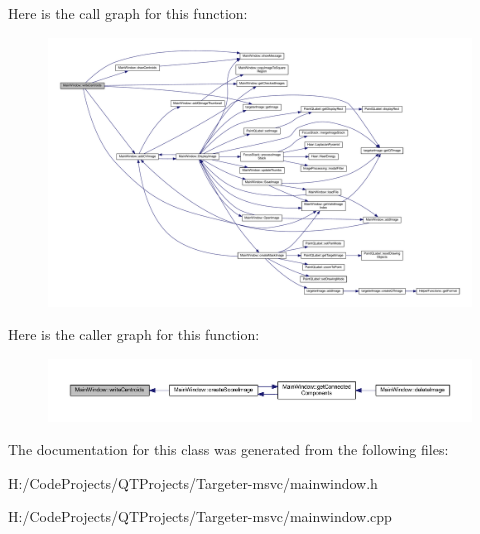 Here is the call graph for this function\+:
\nopagebreak
\begin{figure}[H]
\begin{center}
\leavevmode
\includegraphics[width=350pt]{class_main_window_aa137f4371bae807873da7862f4102521_cgraph}
\end{center}
\end{figure}
Here is the caller graph for this function\+:
\nopagebreak
\begin{figure}[H]
\begin{center}
\leavevmode
\includegraphics[width=350pt]{class_main_window_aa137f4371bae807873da7862f4102521_icgraph}
\end{center}
\end{figure}


The documentation for this class was generated from the following files\+:\begin{DoxyCompactItemize}
\item 
H\+:/\+Code\+Projects/\+Q\+T\+Projects/\+Targeter-\/msvc/mainwindow.\+h\item 
H\+:/\+Code\+Projects/\+Q\+T\+Projects/\+Targeter-\/msvc/mainwindow.\+cpp\end{DoxyCompactItemize}
